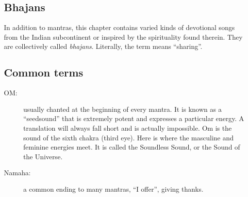   \subsection*{Bhajans}
  In addition to mantras, this chapter contains varied kinds of devotional songs from the Indian
  subcontinent or inspired by the spirituality found therein. They are collectively called
  \emph{bhajans}. Literally, the term means ``sharing''.

  \subsection*{Common terms}
  \begin{description}
   \item[OM:] usually chanted at the beginning of every mantra. It is known as a ``seedsound'' that
     is extremely potent and expresses a particular energy. A translation will always fall short
     and is actually impossible. Om is the sound of the sixth chakra (third eye). Here is where
     the masculine and feminine energies meet. It is called the Soundless Sound, or the Sound of
     the Universe.
   \item[Namaha:] a common ending to many mantras, ``I offer'', giving thanks.
  \end{description}


